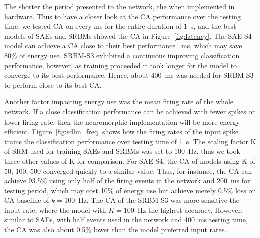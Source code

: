 The shorter the period \DIFdelbegin {}\DIFdelend \DIFaddbegin {}\DIFaddend presented to the network, the \DIFdelbegin {}\DIFdelend \DIFaddbegin {}\DIFaddend when implemented in hardware.
Thus to have a closer look at the CA performance over the testing time, we tested \DIFaddbegin {}\DIFaddend CA on every ms for the entire duration of 1~s, and the best models of SAEs and SRBMs showed the CA in Figure~\ref{fig:latency}.
The SAE-S4 model can achieve a CA close to their best performance \DIFdelbegin {}\DIFdelend \DIFaddbegin {}~ms, which may save 80\% of energy use.
SRBM-S3 exhibited a continuous improving classification performance, however, as training proceeded it took longer for the model to converge to its best performance.
Hence, about 400~ms was needed for SRBM-S3 to perform close to its best CA.

Another factor impacting energy use was the mean firing rate of the whole network.
If a close classification performance can be achieved with fewer spikes or \DIFaddbegin {}\DIFaddend lower firing rate, then the neuromorphic implementation will be more energy efficient.
Figure~\ref{fig:sdlm_freq} shows how the firing rates of the input spike trains \DIFdelbegin {}\DIFdelend \DIFaddbegin {}\DIFaddend the classification performance over testing time of 1~s.
The scaling factor K of SRM used for training SAEs and SRBMs was set to 100~Hz, thus we took three other values of K for comparison.
For SAE-S4, the CA of models using K of 50, 100, 500 converged quickly to a similar value.
Thus, for instance, the CA can achieve 93.5\% using only half of the firing events in the network and 200~ms for testing period, which may cost 10\% of energy use but achieve merely 0.5\% loss on CA \DIFdelbegin {}\DIFdelend \DIFaddbegin {}\DIFaddend baseline of $k=100$~Hz.
The CA of the SRBM-S3 was more sensitive \DIFdelbegin {}\DIFdelend \DIFaddbegin {}\DIFaddend the input rate, where the model with $K=100$~Hz \DIFdelbegin {}\DIFdelend \DIFaddbegin {}\DIFaddend the highest accuracy.
However, similar to SAEs, with half \DIFaddbegin {}\DIFaddend events used in the network and 400~ms testing time, the CA was also about 0.5\% lower than the model \DIFdelbegin {}\DIFdelend \DIFaddbegin {}\DIFaddend preferred input rates.

